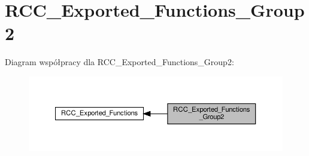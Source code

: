 \hypertarget{group___r_c_c___exported___functions___group2}{}\section{R\+C\+C\+\_\+\+Exported\+\_\+\+Functions\+\_\+\+Group2}
\label{group___r_c_c___exported___functions___group2}
Diagram współpracy dla R\+C\+C\+\_\+\+Exported\+\_\+\+Functions\+\_\+\+Group2\+:\nopagebreak
\begin{figure}[H]
\begin{center}
\leavevmode
\includegraphics[width=350pt]{group___r_c_c___exported___functions___group2}
\end{center}
\end{figure}

